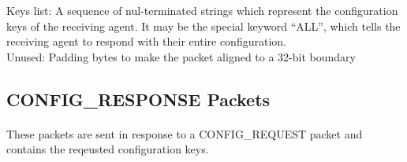 \documentclass[11pt]{article}
\begin{document}
\newline
Keys list:  A sequence of nul-terminated strings which represent the configuration keys of the receiving agent.
It may be the special keyword “ALL”, which tells the receiving agent to respond with their entire configuration.\\
Unused: Padding bytes to make the packet aligned to a 32-bit boundary

\subsection {CONFIG\_RESPONSE Packets}
\paragraph{}
These packets are sent in response to a CONFIG\_REQUEST packet and contains the reqeusted configuration keys.
\newline
\end{document}
